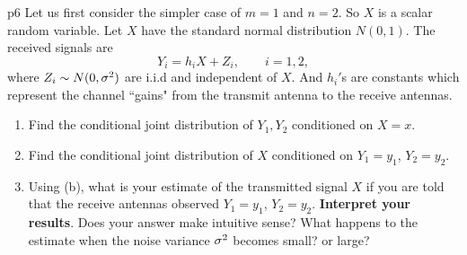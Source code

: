 \documentclass[a4paper, 11pt]{article}
\begin{document}
\begin{problem}{%
    }{p6%
    }
    Let us first consider the simpler case of $m=1$ and $n=2$. So $X$ is a scalar random variable. Let $X$ have the standard normal distribution $N(0,1)$. The received signals are $$Y_i=h_iX+Z_i,\qquad i=1,2,$$where $Z_i\sim N(0,\sigma^2)$ are i.i.d and independent of $X$. And $h_i'$s are constants which represent the channel ``gains" from the transmit antenna to the receive antennas.\begin{enumerate}[label=(\alph*)]
        \item Find the conditional joint distribution of $Y_1,Y_2$ conditioned on $X=x$.
        \item Find the conditional joint distribution of $X$ conditioned on $Y_1=y_1$, $Y_2=y_2$.
        \item Using (b), what is your estimate of the transmitted signal $X$ if you are told that the receive antennas observed $Y_1=y_1$, $Y_2=y_2$. \textbf{Interpret your results}. Does your answer make intuitive sense? What happens to the estimate when the noise variance $\sigma^2$ becomes small? or large?
    \end{enumerate}
\end{problem}
\end{document}
